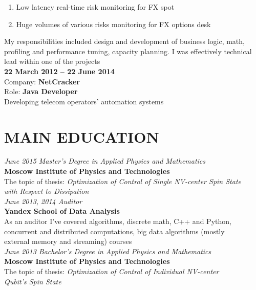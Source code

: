 \documentclass[margin,12pt]{res}
\begin{document}
\begin{resume}
\begin{enumerate}
    \item Low latency real-time risk monitoring for FX spot 
    \vspace{-5pt}
    \item Huge volumes of various risks monitoring for FX options desk
\end{enumerate}
\vspace{-14pt}
My responsibilities included design and development of business logic, math,\\ 
profiling and performance tuning, capacity planning. I was effectively technical\\
 lead within one of the projects\\
\newline
\textbf{22 March 2012 -- 22 June 2014}\\
Company: \textbf{NetCracker}\\
Role: \textbf{Java Developer}\\
Developing telecom operators' automation systems

\section{MAIN EDUCATION}
\textit{June 2015 Master's Degree in Applied Physics and Mathematics\\}
\textbf{Moscow Institute of Physics and Technologies}\\
The topic of thesis: \textit{Optimization of Control of Single NV-center Spin State \\
with Respect to Dissipation}\\
\newline
\textit{June 2013, 2014 Auditor\\}
\textbf{Yandex School of Data Analysis}\\
As an auditor I've covered algorithms, discrete math, C++ and Python,\\
concurrent and distributed computations, big data algorithms (mostly\\
external memory and streaming) courses\\
\newline
\newline
\textit{June 2013 Bachelor's Degree in Applied Physics and Mathematics\\}
\textbf{Moscow Institute of Physics and Technologies}\\
The topic of thesis: \textit{Optimization of Control of Individual NV-center\\ 
Qubit's Spin State}


\end{resume}
\end{document}
